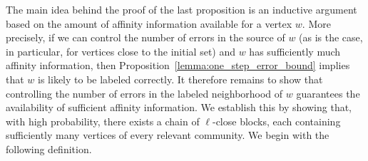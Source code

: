 \documentclass[11pt, a4paper]{amsart}
\newtheorem{lemma}[theorem]{Lemma}
\newcommand{\1}{\mathbf{1}}
\theoremstyle{definition}
\theoremstyle{remark}
\theoremstyle{definition}
\newcommand{\invisible}[1]{}
\begin{document}
The main idea behind the proof of the last proposition is an inductive argument based on the amount of affinity information available for a vertex $w$. More precisely, if we can control the number of errors in the source of $w$ (as is the case, in particular, for vertices close to the initial set) and $w$ has sufficiently much affinity information, then Proposition~\ref{lemma:one_step_error_bound} implies that $w$ is likely to be labeled correctly. It therefore remains to show that controlling the number of errors in the labeled neighborhood of $w$ guarantees the availability of sufficient affinity information. We establish this by showing that, with high probability, there exists a chain of $\ell$-close blocks, each containing sufficiently many vertices of every relevant community. We begin with the following definition.
\invisible{
\begin{lemma}[Propagation error bound]\label{lemma:one_step_error_bound}
    Let $\tau \geq 1$. Assume $u_\tau$ is the vertex labeled at step $\tau$ using Phase II of Algorithm~\ref{alg:exact-recovery},
    and the source $S$ on $u_\tau$ at step $\tau$ has at most $M$ errors. Under Assumption \ref{ass:bounded-ll}, for any permissible relabeling $\omega^* \in \Omega_{\pi, P}$, we have, for $\rho_2 \coloneqq (k-1)e^{2M\rho}$,
    \begin{equation}
        \mathbb P(\hat\sigma(u_\tau) \neq \omega^* \circ \sigma^*(u_\tau) \mid \mathcal F_{\tau-1}) \leq \rho_2 e^{-\mathcal{I}_S(u_\tau)}.
    \end{equation}
\end{lemma}
\begin{proof}
     Let $\omega^* \circ \sigma^*(u) = a$ and fix $b\neq a$. If $\hat \sigma(u) = b$, then we have
    \begin{equation}
        \Lambda_b \coloneqq \sum_{v \in S} \log \frac{\bar p_{b \hat{\sigma}(v)}(X_{uv};\|u-v\|)}{\bar p_{a \hat{\sigma}(v)}(X_{uv};\|u-v\|)} \geq 0.
    \end{equation}
    Then, by Markov's inequality, we have for all $t \in (0,1)$, 
    \begin{align}
        \mathbb{P}(\Lambda_b \geq 0 \mid \mathcal{F}_{\tau-1}) &= \mathbb{P}(e^{t\Lambda_b} \geq 1 \mid \mathcal{F}_{\tau-1}) \\
        &\leq \mathbb{E}(e^{t\Lambda_b} \mid \mathcal{F}_{\tau-1}) \\
        &= \prod_{v \in S} \mathbb{E}_{X_{uv} \sim p_{a\sigma^*(v)} }\left(\left(\frac{\bar{p}_{b \hat{\sigma}(v)}(X_{uv};\|u-v\|)}{\bar{p}_{a \hat{\sigma}(v)}(X_{uv};\|u-v\|)}\right)^t \mid \mathcal {F}_{\tau-1}\right) \\

\end{align}
\end{proof}}
\end{document}
